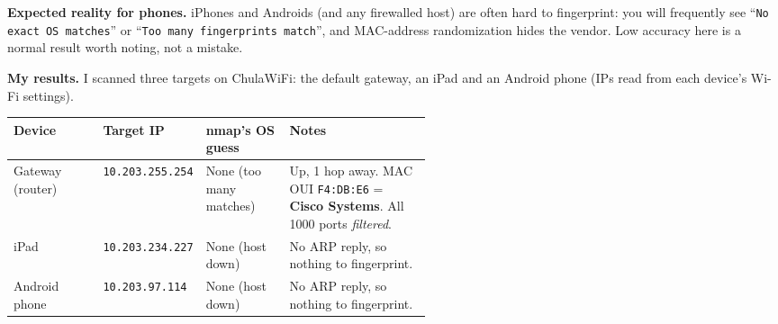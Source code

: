 \documentclass[a4paper, 10pt]{article}
\begin{document}
\begin{solution}
	\myspace

	\noindent \textbf{Expected reality for phones.} iPhones and Androids (and any firewalled host)
	are often hard to fingerprint: you will frequently see ``\texttt{No exact OS matches}'' or ``\texttt{Too
	many fingerprints match}'', and MAC-address randomization hides the vendor. Low accuracy here is a
	normal result worth noting, not a mistake.

	\myspace[v][1]

	\noindent \textbf{My results.} I scanned three targets on ChulaWiFi: the default gateway, an
	iPad and an Android phone (IPs read from each device's Wi-Fi settings).

	\myspace[v][1]

	\begin{center}
	\begin{tabular}{|l|l|p{0.2\linewidth}|p{0.34\linewidth}|}
		\hline
		\textbf{Device} & \textbf{Target IP} & \textbf{nmap's OS guess} & \textbf{Notes} \\
		\hline
		Gateway (router) & \texttt{10.203.255.254} & None (too many matches) &
		    Up, 1 hop away. MAC OUI \texttt{F4:DB:E6} = \textbf{Cisco Systems}. All 1000 ports
		    \emph{filtered}. \\
		iPad             & \texttt{10.203.234.227} & None (host down) & No ARP reply, so nothing to fingerprint. \\
		Android phone    & \texttt{10.203.97.114}  & None (host down) & No ARP reply, so nothing to fingerprint. \\
		\hline
	\end{tabular}
	\end{center}



\end{solution}
\end{document}
